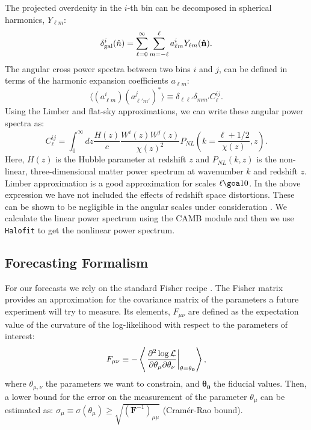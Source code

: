 \documentclass[a4paper,fleqn,usenatbib]{mnras}
\begin{document}
The projected overdenity in the $i$-th bin can be decomposed in spherical harmonics, $Y_{\ell m}$:
\begin{equation}
\delta^i_{\mbox{\scriptsize{gal}}}(\hat{n}) = \sum_{\ell = 0}^{\infty}\sum_{m=-\ell}^{\ell} a_{\ell m}^i Y_{\ell m} (\mathbf{\hat{n}}).
\end{equation}
The angular cross power spectra between two bins $i$ and $j$, can be defined in terms of the harmonic expansion coefficients $a_{\ell m}$: 
\begin{equation}
\langle (a_{\ell m}^i)(a_{\ell' m'}^j)^* \rangle \equiv \delta_{\ell \ell'}\delta_{m m'} C_\ell^{ij}. 
\end{equation}
Using the Limber \citep{Limber1953,Loverde2008} and flat-sky approximations, we can write these  angular power spectra as: 
\begin{equation} 
\label{eq: APS}
C_\ell^{ij} = \int_0^\infty dz \frac{H(z)}{c}\frac{W^i(z)W^j(z)}{\chi(z)^2}P_{NL}\left(k=\frac{\ell+1/2}{\chi(z)}, z \right).
\end{equation}
Here, $H(z)$ is the Hubble parameter at redshift $z$ and $P_{NL}(k,z)$ is the non-linear, three-dimensional matter power spectrum at wavenumber $k$ and redshift $z$. Limber approximation is a good approximation for scales $\ell \goa 10$. In the above expression we have not included the effects of redshift space distortions. These can be shown to be negligible in the angular scales under consideration \citep{Padmanabhan2007}. We calculate the linear power spectrum using the CAMB module  \citep{Lewis2000} and then we use \texttt{Halofit} \citep{Takahashi2012} to get the nonlinear power spectrum. 


\subsection{Forecasting Formalism}
\label{subsec: forecasts}

For our forecasts we rely on the standard Fisher recipe \citep[see e.g.,][]{Tegmark1997}. The Fisher matrix provides an approximation for the covariance matrix of the parameters a future experiment will try to measure.  Its elements, $F_{\mu \nu}$ are defined as the expectation value of the curvature of the log-likelihood with respect to the parameters of interest:
\begin{equation}
F_{\mu \nu} \equiv - \left\langle\left. \frac{\partial^2 \log {\cal{L}}}{\partial \theta_\mu \partial \theta_\nu} \right|_{\mathbf{\theta}=\mathbf{\theta_0}}\right\rangle,
\end{equation}
where $\theta_{\mu,\nu}$ the parameters we want to constrain,  and $\mathbf{\theta_0}$ the fiducial values. Then, a lower bound for the error on the measurement of the parameter $\theta_\mu$ can be estimated as: $\sigma_\mu \equiv \sigma(\theta_\mu) \geq \sqrt{(\mathbf{F}^{-1})_{\mu \mu}}$ (Cram\'er-Rao bound).
\end{document}
